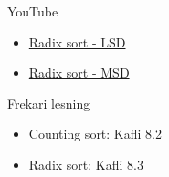 \documentclass{beamer}
\begin{document}
\begin{frame}{YouTube}
\begin{itemize}
 \item \href{https://www.youtube.com/watch?v=LyRWppObda4}{Radix sort - LSD}
 \item \href{https://www.youtube.com/watch?v=Tmq1UkL7xeU}{Radix sort - MSD}
\end{itemize}
\end{frame}

\begin{frame}{Frekari lesning}
\begin{itemize}
 \item Counting sort: Kafli 8.2
 \item Radix sort: Kafli 8.3
\end{itemize}

\end{frame}
\end{document}
